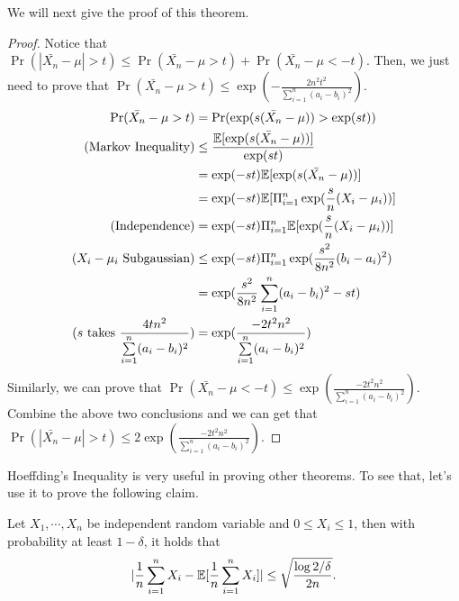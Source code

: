 \documentclass[../main.tex]{subfiles}
\begin{document}
We will next give the proof of this theorem.

\begin{proof}
	Notice that $\Pr(|\bar{X_n} - \mu| > t) \leq  \Pr(\bar{X_n} - \mu > t) + \Pr(\bar{X_n} - \mu < -t)$. Then, we just need to prove that $\Pr(\bar{X_n} - \mu > t) \leq \exp(-\frac{2n^2t^2}{\sum\limits_{i=1}^n (a_i - b_i)^2})$.
	\begin{equation*}
		\begin{aligned}		
			\Pr(\bar{X_n} - \mu > t) & = \Pr(\exp(s(\bar{X_n} - \mu)) > \exp(st)) \\
									(\textmd{Markov Inequality}) & \leq \frac{\EE[\exp(s(\bar{X_n} - \mu))]}{\exp(st)} \\
																& = \exp(-st)  \EE[\exp(s(\bar{X_n} - \mu))]\\
																& = \exp(-st)  \EE[\Pi_{i=1}^n \exp(\frac{s}{n} (X_i - \mu_i))] \\
															(\textmd{Independence})	& = \exp(-st) \Pi_{i=1}^n \EE[ \exp(\frac{s}{n} (X_i - \mu_i))] \\
														(X_i - \mu_i\ \textmd{Subgaussian})	& \leq  \exp(-st) \Pi_{i=1}^n \exp(\frac{s^2}{8n^2} (b_i - a_i)^2) \\
														& = \exp(\frac{s^2}{8n^2} \sum\limits_{i=1}^n (a_i - b_i)^2 - st ) \\
												(s\ \textmd{takes}\ \frac{4tn^2}{\sum\limits_{i=1}^n (a_i - b_i)^2})& = \exp(\frac{-2t^2n^2}{\sum\limits_{i=1}^n (a_i - b_i)^2}) 
		\end{aligned}
	\end{equation*}
	Similarly, we can prove that $\Pr(\bar{X_n} - \mu < -t) \leq \exp(\frac{-2t^2n^2}{\sum\limits_{i=1}^n (a_i - b_i)^2}) $. Combine the above two conclusions and we can get that $\Pr(|\bar{X_n} - \mu| > t) \leq 2 \exp(\frac{-2t^2n^2}{\sum\limits_{i=1}^n (a_i - b_i)^2})$.
\end{proof}

Hoeffding's Inequality is very useful in proving other theorems. To see that, let's use it to prove the following claim.

\begin{claim}
	Let $X_1, \cdots, X_n$ be independent random variable and $0 \leq X_i \leq 1$, then with probability at least $1-\delta$, it holds that 
	\begin{equation}
		|\frac{1}{n} \sum\limits_{i=1}^n X_i - \mathbb{E}[\frac{1}{n} \sum\limits_{i = 1}^n X_i]| \leq \sqrt{\frac{\log 2/\delta}{2n}}.
	\end{equation}
\end{claim}
\end{document}
